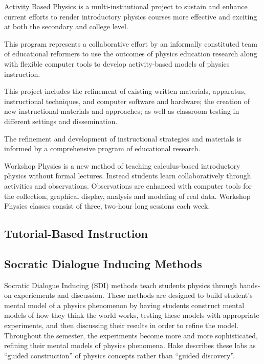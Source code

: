 Activity Based Physics is a multi-institutional project to sustain and enhance current efforts to render introductory physics courses more effective and exciting at both the secondary and college level.

This program represents a collaborative effort by an informally constituted team of educational reformers to use the outcomes of physics education research along with flexible computer tools to develop activity-based models of physics instruction.

This project includes the refinement of existing written materials, apparatus, instructional techniques, and computer software and hardware; the creation of new instructional materials and approaches; as well as classroom testing in different settings and dissemination.

The refinement and development of instructional strategies and materials is informed by a comprehensive program of educational research.

Workshop Physics is a new method of teaching calculus-based introductory physics without formal lectures. Instead students learn collaboratively through activities and observations. Observations are enhanced with computer tools for the collection, graphical display, analysis and modeling of real data. Workshop Physics classes consist of three, two-hour long sessions each week.

\subsection{Tutorial-Based Instruction}

\subsection{Socratic Dialogue Inducing Methods}

Socratic Dialogue Inducing (SDI) methods teach students physics through hands-on experiements and discussion. These methods are designed to build student's mental model of a physics phenomenon by having students construct mental models of how they think the world works, testing these models with appropriate experiments, and then discussing their results in order to refine the model. Throughout the semester, the experiments become more and more sophisticated, refining their mental models of physics phenomena. Hake describes these labs as ``guided construction'' of physics concepts rather than ``guided discovery''\cite{hake1992}.

